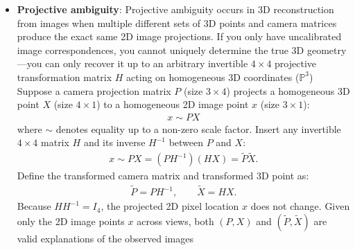 \documentclass{report}
\begin{document}
\begin{itemize}
            \begin{align*}
                P_{j}X_{i} = (P_{j}H^{-1})(HX_{i})
            .\end{align*}
            There is no compelling reason to choose one set of points and camera matrices over the other. The choice of H is essentially arbitrary, and we say that the reconstruction has a projective ambiguity, or is a projective reconstruction.
            \bigbreak \noindent 
            However, the good news is that this is the worst that can happen. It is possible to reconstruct a set of points from two views, up to an unavoidable projective ambiguity. Well, to be able to say this, we need to make a few qualifications; there must be sufficiently many points, at least seven, and they must not lie in one of various well-defined critical configurations.
        \item \textbf{Projective ambiguity}: Projective ambiguity occurs in 3D reconstruction from images when multiple different sets of 3D points and camera matrices produce the exact same 2D image projections. If you only have uncalibrated image correspondences, you cannot uniquely determine the true 3D geometry—you can only recover it up to an arbitrary invertible \(4 \times 4\) projective transformation matrix \(H\) acting on homogeneous 3D coordinates (\(\mathbb{P}^{3}\))
            \bigbreak \noindent 
            Suppose a camera projection matrix \(P\) (size \(3 \times 4\)) projects a homogeneous 3D point \(X\) (size \(4 \times 1\)) to a homogeneous 2D image point \(x\) (size \(3 \times 1\)):
            \begin{align*}
                x \sim PX
            \end{align*}
            where \(\sim \) denotes equality up to a non-zero scale factor. Insert any invertible \(4 \times 4\) matrix \(H\) and its inverse \(H^{-1}\) between \(P\) and \(X\): 
            \begin{align*}
                x\sim PX=(PH^{-1})(HX)=\tilde{P}\tilde{X}
            .\end{align*}
            Define the transformed camera matrix and transformed 3D point as:
            \begin{align*}
                \tilde{P}=PH^{-1},\qquad \tilde{X}=HX
            .\end{align*}
            Because \(H H^{-1} = I_4\), the projected 2D pixel location \(x\) does not change. Given only the 2D image points \(x\) across views, both \((P, X)\) and \((\tilde{P}, \tilde{X})\) are valid explanations of the observed images

\end{itemize}
\end{document}
